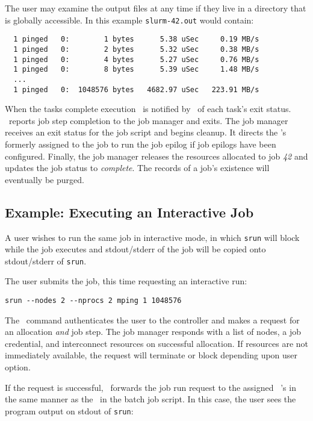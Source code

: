 The user may examine the output files at any time if they live
in a directory that is globally accessible. In this example
{\tt slurm-42.out} would  contain:

\begin{verbatim}
  1 pinged   0:        1 bytes      5.38 uSec     0.19 MB/s                     
  1 pinged   0:        2 bytes      5.32 uSec     0.38 MB/s                     
  1 pinged   0:        4 bytes      5.27 uSec     0.76 MB/s                     
  1 pinged   0:        8 bytes      5.39 uSec     1.48 MB/s                     
  ...
  1 pinged   0:  1048576 bytes   4682.97 uSec   223.91 MB/s              
\end{verbatim}

When the tasks complete execution \srun\ is notified by \slurmd\ of each
task's exit status. \srun\ reports job step completion to the job manager
and exits. The job manager receives an exit status for the job script
and begins cleanup. It directs the \slurmd 's formerly assigned to the
job to run the job epilog if job epilogs have been configured. Finally,
the job manager releases the resources allocated to job {\em 42}
and updates the job status to {\em complete}. The records of a job's
existence will eventually be purged.

\subsection{Example:  Executing an Interactive Job}

A user wishes to run the same job in interactive mode, in which {\tt srun}
will block while the job executes and stdout/stderr of the job will be 
copied onto stdout/stderr of {\tt srun}.

The user submits the job, this time requesting an interactive run:
\begin{verbatim}
srun --nodes 2 --nprocs 2 mping 1 1048576
\end{verbatim}

The \srun\ command authenticates the user to the controller and
makes a request for an allocation {\em and} job step. The job manager
responds with a list of nodes, a job credential, and interconnect
resources on successful allocation. If resources are not immediately
available, the request will terminate or block depending upon user
option.

If the request is successful, \srun\ forwards the job run request
to the assigned \slurmd~'s in the same manner as the \srun\ in the
batch job script. In this case, the user sees the program output on 
stdout of {\tt srun}:

